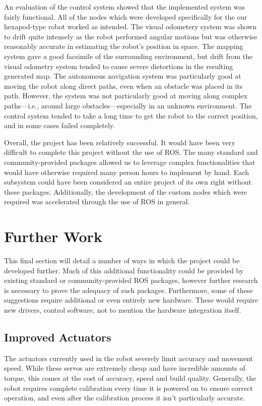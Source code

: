 An evaluation of the control system showed that the implemented system was fairly functional. All of the nodes which were developed specifically for the our hexapod-type robot worked as intended.  The visual odometery system was shown to drift quite intensely as the robot performed angular motions but was otherwise reasonably accurate in estimating the robot's position in space. The mapping system gave a good facsimile of the surrounding environment, but drift from the visual odometry system tended to cause severe distortions in the resulting generated map. The autonomous navigation system was particularly good at moving the robot along direct paths, even when an obstacle was placed in its path. However, the system was not particularly good at moving along complex paths---i.e., around large obstacles---especially in an unknown environment. The control system tended to take a long time to get the robot to the correct position, and in some cases failed completely.

Overall, the project has been relatively successful. It would have been very difficult to complete this project without the use of ROS. The many standard and community-provided packages allowed us to leverage complex functionalities that would have otherwise required many person hours to implement by hand. Each subsystem could have been considered an entire project of its own right without these packages. Additionally, the development of the custom nodes which were required was accelerated through the use of ROS in general.


\section{Further Work}

This final section will detail a number of ways in which the project could be developed further. Much of this additional functionality could be provided by existing standard or community-provided ROS packages, however further research is necessary to prove the adequacy of such packages. Furthermore, some of these suggestions require additional or even entirely new hardware. These would require new drivers, control software, not to mention the hardware integration itself.

\subsection{Improved Actuators}
The actuators currently used in the robot severely limit accuracy and movement speed. While these servos are extremely cheap and have incredible amounts of torque, this comes at the cost of accuracy, speed and build quality. Generally, the robot requires complete calibration every time it is powered on to ensure correct operation, and even after the calibration process it isn't particularly accurate.

